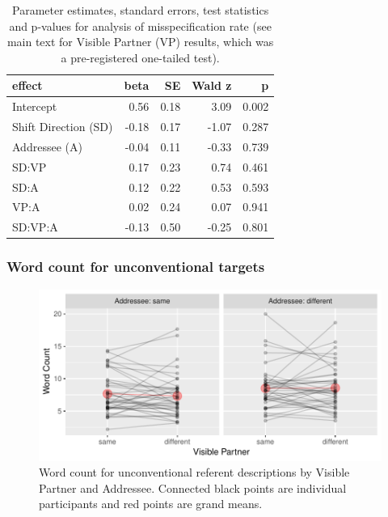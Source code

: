 \documentclass[natbib,doc,a4paper]{apa6}
\begin{document}
\begin{table}[ht]
\centering
\caption{Parameter estimates, standard errors, test statistics and p-values for analysis of misspecification rate (see main text for Visible Partner (VP) results, which was a pre-registered one-tailed test).} 
\label{tbl:exp3-lmem}
\begin{tabular}{lrrrr}
  \hline
effect & beta & SE & Wald z & p \\ 
  \hline
Intercept & 0.56 & 0.18 & 3.09 & 0.002 \\ 
  Shift Direction (SD) & -0.18 & 0.17 & -1.07 & 0.287 \\ 
  Addressee (A) & -0.04 & 0.11 & -0.33 & 0.739 \\ 
  SD:VP & 0.17 & 0.23 & 0.74 & 0.461 \\ 
  SD:A & 0.12 & 0.22 & 0.53 & 0.593 \\ 
  VP:A & 0.02 & 0.24 & 0.07 & 0.941 \\ 
  SD:VP:A & -0.13 & 0.50 & -0.25 & 0.801 \\ 
   \hline
\end{tabular}
\end{table}

\subsubsection*{Word count for unconventional targets}
\label{sec:org146e609}

\begin{figure}[htbp]
\centering
\includegraphics[width=.9\linewidth]{exp3/img/exp3-wc-plot.pdf}
\caption{\label{fig:org727ec8c}
Word count for unconventional referent descriptions by Visible Partner and Addressee. Connected black points are individual participants and red points are grand means.}
\end{figure}
\end{document}
